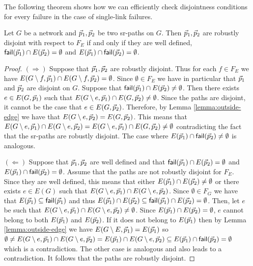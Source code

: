 The following theorem shows how we can efficiently check disjointness conditions for every failure in the case of single-link
failures.

\begin{theorem}
\label{thm:single-link}
Let $G$ be a network and $\vec{p}_1, \vec{p}_2$ be two sr-paths on $G$. Then $\vec{p}_1, \vec{p}_2$ are robustly
disjoint with respect to $F_E$ if and only if they are well defined, $\mathsf{fail}(\vec{p}_1) \cap E(\vec{p}_2) = \emptyset$ and 
$E(\vec{p}_1) \cap \mathsf{fail}(\vec{p}_2) = \emptyset$.
\end{theorem}

\begin{proof}
$(\Rightarrow)$ Suppose that $\vec{p}_1, \vec{p}_2$ are robustly disjoint. 
Thus for each $f \in F_E$ we have $E(G \setminus f, \vec{p}_1) \cap E(G \setminus f, \vec{p}_2) = \emptyset$.
Since $\emptyset \in F_E$ we have in particular that $\vec{p}_1$ and $\vec{p}_2$ are disjoint on $G$. Suppose that $\mathsf{fail}(\vec{p}_1) \cap E(\vec{p}_2) \neq \emptyset$.
Then there exists $e \in E(G, \vec{p}_1)$ such that $E(G \setminus e, \vec{p}_1) \cap E(G, \vec{p}_2) \neq \emptyset$. Since the paths are disjoint, 
it cannot be the case that $e \in E(G, \vec{p}_2)$. Therefore, by Lemma \ref{lemma:outside-edge} we have that $E(G \setminus e, \vec{p}_2) = E(G, \vec{p}_2)$.
This means that $E(G \setminus e, \vec{p}_1) \cap E(G \setminus e, \vec{p}_2) = E(G \setminus e, \vec{p}_1) \cap E(G, \vec{p}_2) \neq \emptyset$ contradicting the
fact that the sr-paths are robustly disjoint. The case where $E(\vec{p}_1) \cap \mathsf{fail}(\vec{p}_2) \neq \emptyset$ is analogous.

$(\Leftarrow)$ Suppose that $\vec{p}_1, \vec{p}_2$ are well defined and that $\mathsf{fail}(\vec{p}_1) \cap E(\vec{p}_2) = \emptyset$ and 
$E(\vec{p}_1) \cap \mathsf{fail}(\vec{p}_2) = \emptyset$. Assume that the paths are not robustly disjoint for $F_E$. Since they are well defined, 
this means that either $E(\vec{p}_1) \cap E(\vec{p}_2) \neq \emptyset$ or
there exists $e \in E(G)$ such that $E(G \setminus e, \vec{p}_1) \cap E(G \setminus e, \vec{p}_2)$. Since $\emptyset \in F_G$ we have
that $E(\vec{p}_1) \subseteq \mathsf{fail}(\vec{p}_1)$ and thus $E(\vec{p}_1) \cap E(\vec{p}_2) \subseteq \mathsf{fail}(\vec{p}_1) \cap E(\vec{p}_2) = \emptyset$. Then, let $e$ be such that
$E(G \setminus e, \vec{p}_1) \cap E(G \setminus e, \vec{p}_2) \neq \emptyset$. Since $E(\vec{p}_1) \cap E(\vec{p}_2) = \emptyset$, $e$ cannot belong to both
$E(\vec{p}_1)$ and $E(\vec{p}_2)$. If it does not belong to $E(\vec{p}_1)$ then by Lemma \ref{lemma:outside-edge} we have 
$E(G \setminus E, \vec{p}_1) = E(\vec{p}_1)$ so 
$\emptyset \neq E(G \setminus e, \vec{p}_1) \cap E(G \setminus e, \vec{p}_2) = E(\vec{p}_1) \cap E(G \setminus e, \vec{p}_2) \subseteq E(\vec{p}_1) \cap \mathsf{fail}(\vec{p}_2) = \emptyset$
which is a contradiction. The other case is analogous and also leads to a contradiction. It follows that the paths are robustly disjoint.
\end{proof}

